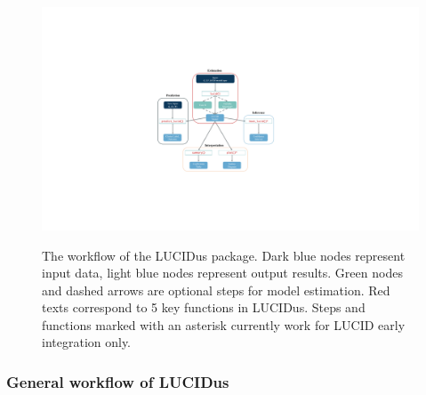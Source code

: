 \begin{figure}

{\centering \includegraphics[width=1\linewidth,alt={graphic without alt text}]{figures/fig2} 

}

\caption{The workflow of the LUCIDus package. Dark blue nodes represent input data, light blue nodes represent output results. Green nodes and dashed arrows are optional steps for model estimation. Red texts correspond to 5 key functions in LUCIDus. Steps and functions marked with an asterisk currently work for LUCID early integration only.}\label{fig:fig2}
\end{figure}

\subsubsection{\texorpdfstring{General workflow of \textbf{LUCIDus}}{General workflow of LUCIDus}}\label{sec2.2}

